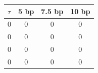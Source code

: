 \documentclass[10pt]{beamer}
\begin{document}
\begin{frame}
  \begin{center}
    \begin{tabular}{l|ccc}
      $\tau$ & 5 bp & 7.5 bp & 10 bp \\
      \hline
      0 & 0 & 0 & 0 \\
      0 & 0 & 0 & 0 \\
      0 & 0 & 0 & 0 \\
      0 & 0 & 0 & 0 \\
    \end{tabular}
  \end{center}
\end{frame}
\end{document}
